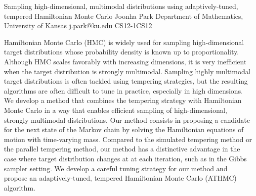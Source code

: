 \begin{talk}
{Sampling high-dimensional, multimodal distributions using adaptively-tuned, tempered Hamiltonian Monte Carlo} %
{Joonha Park} %
{Department of Mathematics, University of Kansas} %
{j.park@ku.edu} %
{} %
{}{}{CS12-1}{CS12}


  Hamiltonian Monte Carlo (HMC) is widely used for sampling high-dimensional target distributions whose probability density is known up to proportionality. Although HMC scales favorably with increasing dimensions, it is very inefficient when the target distribution is strongly multimodal. Sampling highly multimodal target distributions is often tackled using tempering strategies, but the resulting algorithms are often difficult to tune in practice, especially in high dimensions. We develop a method that combines the tempering strategy with Hamiltonian Monte Carlo in a way that enables efficient sampling of high-dimensional, strongly multimodal distributions. Our method consists in proposing a candidate for the next state of the Markov chain by solving the Hamiltonian equations of motion with time-varying mass. Compared to the simulated tempering method or the parallel tempering method, our method has a distinctive advantage in the case where target distribution changes at at each iteration, such as in the Gibbs sampler setting. We develop a careful tuning strategy for our method and propose an adaptively-tuned, tempered Hamiltonian Monte Carlo (ATHMC) algorithm.

\end{talk}

